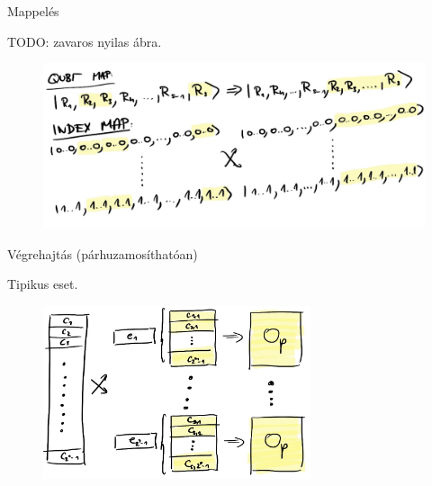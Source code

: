 \documentclass[aspectratio=169]{beamer}
\begin{document}
\begin{frame}{Mappelés}

TODO: zavaros nyilas ábra.

\begin{figure}[H]
    \centering
    \includegraphics[width=\textwidth]{figures/mappeles.png}
\end{figure}

\end{frame}


\begin{frame}{Végrehajtás (párhuzamosíthatóan)}

Tipikus eset.

\begin{figure}[H]
    \centering
    \includegraphics[width=0.7\textwidth]{figures/vegrehajtas.jpg}
\end{figure}

\end{frame}
\end{document}

